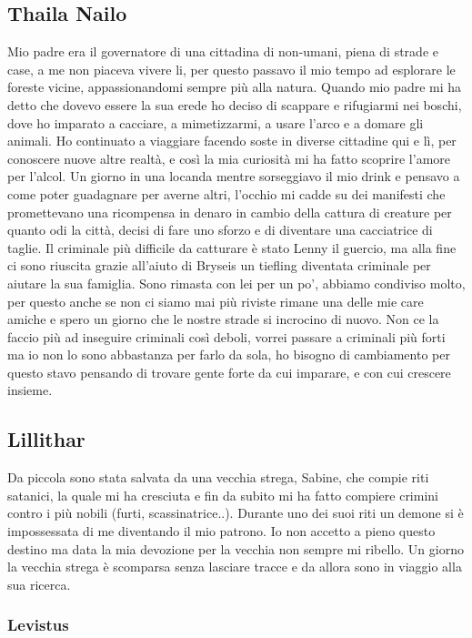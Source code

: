 \documentclass{article}
\begin{document}
          \subsection{Thaila Nailo}
          Mio padre era il governatore di una cittadina di non-umani, piena di strade e case, a me non piaceva vivere li, per questo passavo il mio tempo ad esplorare le foreste vicine, appassionandomi sempre più alla natura. Quando mio padre mi ha detto che dovevo essere la sua erede ho deciso di scappare e rifugiarmi nei boschi, dove ho imparato a cacciare, a mimetizzarmi, a usare l’arco e a domare gli animali. Ho continuato a viaggiare facendo soste in diverse cittadine qui e lì, per conoscere nuove altre realtà, e così la mia curiosità mi ha fatto scoprire l’amore per l’alcol. Un giorno in una locanda mentre sorseggiavo il mio drink e pensavo a come poter guadagnare per averne altri, l’occhio mi cadde su dei manifesti che promettevano una ricompensa in denaro in cambio della cattura di creature per quanto odi la città, decisi di fare uno sforzo e di diventare una cacciatrice di taglie. Il criminale più difficile da catturare è stato Lenny il guercio, ma alla fine ci sono riuscita grazie all’aiuto di Bryseis un tiefling diventata criminale per aiutare la sua famiglia. Sono rimasta con lei per un po’, abbiamo condiviso molto, per questo anche se non ci siamo mai più riviste rimane una delle mie care amiche e spero un giorno che le nostre strade si incrocino di nuovo. Non ce la faccio più ad inseguire criminali così deboli, vorrei passare a criminali più forti ma io non lo sono abbastanza per farlo da sola, ho bisogno di cambiamento per questo stavo pensando di trovare gente forte da cui imparare, e con cui crescere insieme. 

          \subsection{Lillithar}
          Da piccola sono stata salvata da una vecchia strega, Sabine, che compie riti satanici, la quale mi ha cresciuta e fin da subito mi ha fatto compiere crimini contro i più nobili (furti, scassinatrice..). 
          Durante uno dei suoi riti un demone si è impossessata di me diventando il mio patrono. Io non accetto a pieno questo destino ma data la mia devozione per la vecchia non sempre mi ribello. 
          Un giorno la vecchia strega è scomparsa senza lasciare tracce e da allora sono in viaggio alla sua ricerca.
            \subsubsection{Levistus}
\end{document}
